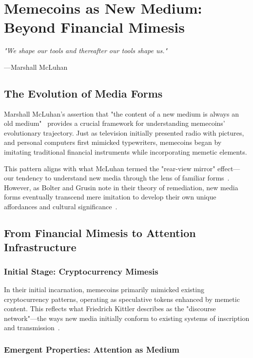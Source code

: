 \documentclass[a4paper,12pt]{article}
\begin{document}
\section{Memecoins as New Medium: Beyond Financial Mimesis}

\epigraph{\textit{"We shape our tools and thereafter our tools shape us."}}{---Marshall McLuhan}

\subsection{The Evolution of Media Forms}

Marshall McLuhan's assertion that "the content of a new medium is always an old medium"~\cite{mcluhan1964understanding} provides a crucial framework for understanding memecoins' evolutionary trajectory. Just as television initially presented radio with pictures, and personal computers first mimicked typewriters, memecoins began by imitating traditional financial instruments while incorporating memetic elements.

This pattern aligns with what McLuhan termed the "rear-view mirror" effect—our tendency to understand new media through the lens of familiar forms~\cite{mcluhan1967medium}. However, as Bolter and Grusin note in their theory of remediation, new media forms eventually transcend mere imitation to develop their own unique affordances and cultural significance~\cite{bolter1999remediation}.

\subsection{From Financial Mimesis to Attention Infrastructure}

\subsubsection{Initial Stage: Cryptocurrency Mimesis}

In their initial incarnation, memecoins primarily mimicked existing cryptocurrency patterns, operating as speculative tokens enhanced by memetic content. This reflects what Friedrich Kittler describes as the "discourse network"—the ways new media initially conform to existing systems of inscription and transmission~\cite{kittler1990discourse}.

\subsubsection{Emergent Properties: Attention as Medium}
\end{document}
